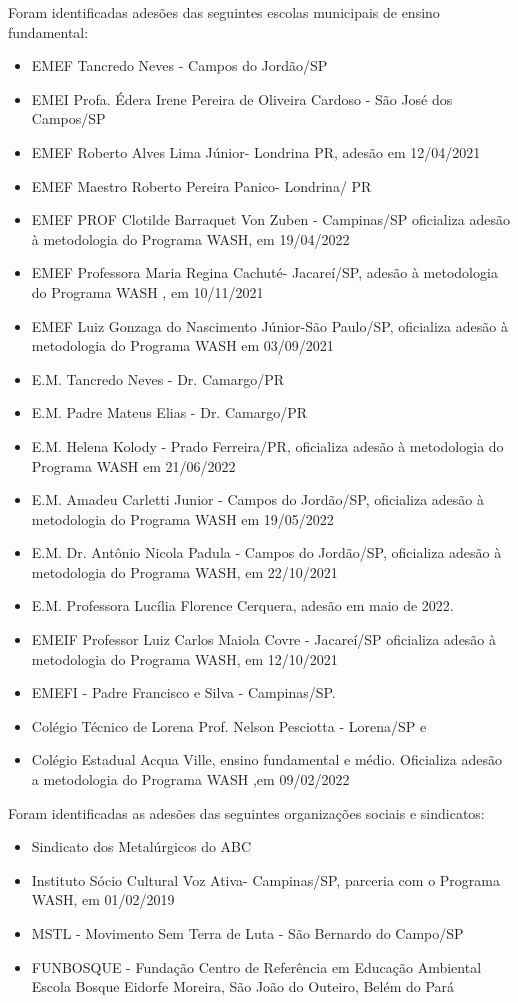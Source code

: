 Foram identificadas adesões das seguintes escolas municipais de ensino fundamental:


\begin{itemize}
\item EMEF Tancredo Neves - Campos do Jordão/SP
\item EMEI Profa. Édera Irene Pereira de Oliveira Cardoso - São José dos Campos/SP
\item EMEF Roberto Alves Lima Júnior- Londrina PR, adesão em 12/04/2021
\item EMEF Maestro Roberto Pereira Panico- Londrina/ PR
\item EMEF PROF Clotilde Barraquet Von Zuben - Campinas/SP oficializa adesão à metodologia do Programa WASH, em 19/04/2022
\item EMEF Professora Maria Regina Cachuté- Jacareí/SP, adesão à metodologia do Programa WASH , em 10/11/2021
\item EMEF Luiz Gonzaga do Nascimento Júnior-São Paulo/SP, oficializa adesão à metodologia do Programa WASH em 03/09/2021
\item E.M. Tancredo Neves - Dr. Camargo/PR
\item E.M. Padre Mateus Elias - Dr. Camargo/PR
\item E.M. Helena Kolody - Prado Ferreira/PR, oficializa adesão à metodologia do Programa WASH em 21/06/2022
\item E.M. Amadeu Carletti Junior - Campos do Jordão/SP, oficializa adesão à metodologia do Programa WASH em 19/05/2022
\item E.M. Dr. Antônio Nicola Padula - Campos do Jordão/SP, oficializa adesão à metodologia do Programa WASH,  em 22/10/2021
\item E.M. Professora Lucília Florence Cerquera, adesão em maio de 2022.
\item EMEIF Professor Luiz Carlos Maiola Covre - Jacareí/SP oficializa adesão à metodologia do Programa WASH, em 12/10/2021
\item EMEFI -  Padre Francisco e Silva - Campinas/SP.
\item Colégio Técnico de Lorena Prof. Nelson Pesciotta - Lorena/SP e
\item Colégio  Estadual Acqua Ville, ensino fundamental e  médio.  Oficializa adesão a metodologia do Programa WASH ,em 09/02/2022
\end{itemize}

Foram identificadas as adesões das seguintes organizações sociais e sindicatos:


\begin{itemize}
\item Sindicato dos Metalúrgicos do ABC
\item Instituto Sócio Cultural Voz Ativa- Campinas/SP,  parceria com o Programa WASH, em 01/02/2019
\item MSTL - Movimento Sem Terra de Luta - São Bernardo do Campo/SP
\item FUNBOSQUE - Fundação Centro de Referência em Educação Ambiental Escola Bosque Eidorfe Moreira, São João do Outeiro, Belém do Pará
\end{itemize}

